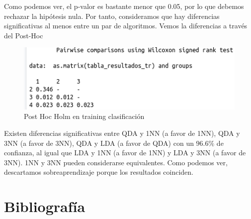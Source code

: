 Como podemos ver, el p-valor es bastante menor que 0.05, por lo que debemos rechazar la hipótesis nula. Por tanto, consideramos que hay diferencias significativas al menos entre un par de algoritmos. Vemos la diferencias a través del Post-Hoc

\begin{figure}[H] %
	\centering
	\includegraphics[scale=0.6]{ph-tr-c.png}  %
	\caption{Post Hoc Holm en training clasificación} 
	\label{fig:ph-tr-c}
\end{figure}

Existen diferencias significativas entre QDA y 1NN (a favor de 1NN), QDA y 3NN (a favor de 3NN), QDA y LDA (a favor de QDA) con un $96.6\%$ de confianza, al igual que LDA y 1NN (a favor de 1NN) y LDA y 3NN (a favor de 3NN). 1NN y 3NN pueden considerarse equivalentes. Como podemos ver, descartamos sobreaprendizaje porque los resultados coinciden.


\newpage
\section{Bibliografía}




